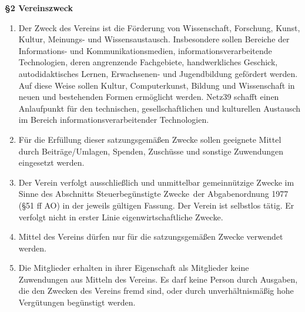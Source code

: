 \documentclass[a4paper,
               12pt,
               titlepage,
               parskip=half]{scrartcl}
\begin{document}
\textbf{§2 Vereinszweck}
{\small 
\begin{enumerate}
	\item Der Zweck des Vereins ist die Förderung von Wissenschaft, Forschung, Kunst, Kultur, Meinungs- und Wissensaustausch. Insbesondere sollen Bereiche der Informations- und Kommunikationsmedien, informationsverarbeitende Technologien, deren angrenzende Fachgebiete, handwerkliches Geschick, autodidaktisches Lernen, Erwachsenen- und Jugendbildung gefördert werden. Auf diese Weise sollen Kultur, Computerkunst, Bildung und Wissenschaft in neuen und bestehenden Formen ermöglicht werden. Netz39 schafft einen Anlaufpunkt für den technischen, gesellschaftlichen und kulturellen Austausch im Bereich informationsverarbeitender Technologien.
	\item Für die Erfüllung dieser satzungsgemäßen Zwecke sollen geeignete Mittel durch Beiträge/Umlagen, Spenden, Zuschüsse und sonstige Zuwendungen eingesetzt werden.
	\item Der Verein verfolgt ausschließlich und unmittelbar gemeinnützige Zwecke im Sinne des Abschnitts \glqq Steuerbegünstigte Zwecke\grqq\ der Abgabenordnung 1977 (§51 ff AO) in der jeweils gültigen Fassung. Der Verein ist selbstlos tätig. Er verfolgt nicht in erster Linie eigenwirtschaftliche Zwecke.
	\item Mittel des Vereins dürfen nur für die satzungsgemäßen Zwecke verwendet werden.
	\item Die Mitglieder erhalten in ihrer Eigenschaft als Mitglieder keine Zuwendungen aus Mitteln des Vereins. Es darf keine Person durch Ausgaben, die den Zwecken des Vereins fremd sind, oder durch unverhältnismäßig hohe Vergütungen begünstigt werden.
\end{enumerate}
}

\newpage
\end{document}
